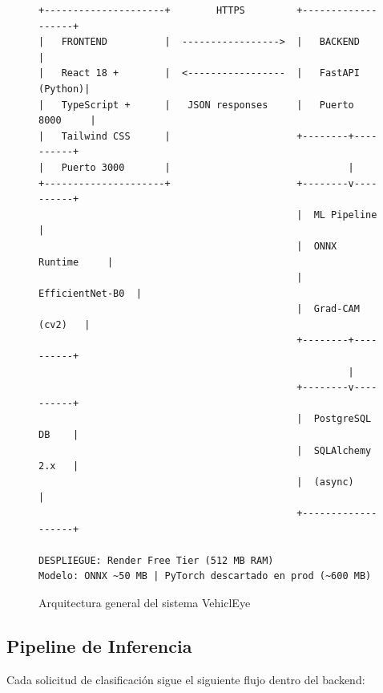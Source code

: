 \documentclass[12pt,a4paper]{article}
\begin{document}
\begin{figure}[H]
\centering
\begin{minipage}{0.95\linewidth}
\begin{verbatim}
+---------------------+        HTTPS         +-------------------+
|   FRONTEND          |  ----------------->  |   BACKEND         |
|   React 18 +        |  <-----------------  |   FastAPI (Python)|
|   TypeScript +      |   JSON responses     |   Puerto 8000     |
|   Tailwind CSS      |                      +--------+----------+
|   Puerto 3000       |                               |
+---------------------+                      +--------v----------+
                                             |  ML Pipeline      |
                                             |  ONNX Runtime     |
                                             |  EfficientNet-B0  |
                                             |  Grad-CAM (cv2)   |
                                             +--------+----------+
                                                      |
                                             +--------v----------+
                                             |  PostgreSQL DB    |
                                             |  SQLAlchemy 2.x   |
                                             |  (async)          |
                                             +-------------------+

DESPLIEGUE: Render Free Tier (512 MB RAM)
Modelo: ONNX ~50 MB | PyTorch descartado en prod (~600 MB)
\end{verbatim}
\end{minipage}
\caption{Arquitectura general del sistema VehiclEye}
\label{fig:arquitectura}
\end{figure}

\subsection{Pipeline de Inferencia}

Cada solicitud de clasificación sigue el siguiente flujo dentro del backend:
\end{document}
